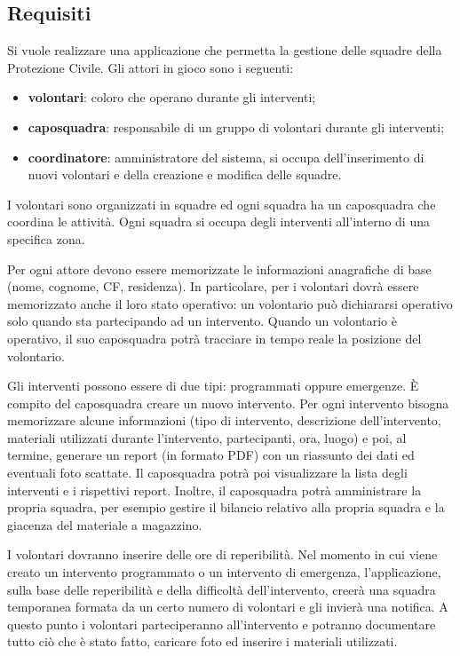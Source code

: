 \subsection{Requisiti}

Si vuole realizzare una applicazione che permetta la gestione delle squadre della Protezione Civile.  
Gli attori in gioco sono i seguenti: 
\begin{itemize}
	\item \textbf{volontari}: coloro che operano durante gli interventi; 
	\item \textbf{caposquadra}: responsabile di un gruppo di volontari durante gli interventi; 
	\item \textbf{coordinatore}: amministratore del sistema, si occupa dell'inserimento di nuovi volontari e della creazione e modifica delle squadre.
\end{itemize}

I volontari sono organizzati in squadre ed ogni squadra ha un caposquadra che coordina le attività. Ogni squadra si occupa degli interventi all’interno di una specifica zona.

Per ogni attore devono essere memorizzate le informazioni anagrafiche di base (nome, cognome, CF, residenza). In particolare, per i volontari dovrà essere memorizzato anche il loro stato operativo: un volontario può dichiararsi operativo solo quando sta partecipando ad un intervento. Quando un volontario è operativo, il suo caposquadra potrà tracciare in tempo reale la posizione del volontario. 

Gli interventi possono essere di due tipi: programmati oppure emergenze. È compito del caposquadra creare un nuovo intervento. Per ogni intervento bisogna memorizzare alcune informazioni (tipo di intervento, descrizione dell'intervento, materiali utilizzati durante l’intervento, partecipanti, ora, luogo) e poi, al termine, generare un report (in formato PDF) con un riassunto dei dati ed eventuali foto scattate. Il caposquadra potrà poi visualizzare la lista degli interventi e i rispettivi report.  Inoltre, il caposquadra potrà amministrare la propria squadra, per esempio gestire il bilancio relativo alla propria squadra e la giacenza del materiale a magazzino.

I volontari dovranno inserire delle ore di reperibilità. Nel momento in cui viene creato un intervento programmato o un intervento di emergenza, l’applicazione, sulla base delle reperibilità e della difficoltà dell’intervento, creerà una squadra temporanea formata da un certo numero di volontari e gli invierà una notifica. A questo punto i volontari parteciperanno all’intervento e potranno documentare tutto ciò che è stato fatto, caricare foto ed inserire i materiali utilizzati.

